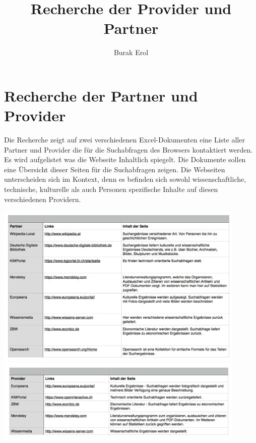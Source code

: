 
\title{Recherche der Provider und Partner}
\author{Burak Erol}


\section{Recherche der Partner und Provider}

Die Recherche zeigt auf zwei verschiedenen Excel-Dokumenten eine Liste aller Partner und Provider die für die Suchabfragen des Browsers kontaktiert werden. Es wird aufgelistet was die Webseite Inhaltlich spiegelt. Die Dokumente sollen eine Übersicht dieser Seiten für die Suchabfragen zeigen. Die Webseiten unterscheiden sich im Kontext, denn es befinden sich sowohl wissenschaftliche, technische, kulturelle als auch Personen spezifische Inhalte auf diesen verschiedenen Providern.

\includegraphics[width=12cm]{Pics/PartnerList}
\newpage
\includegraphics[width=12cm]{Pics/ProviderList}


